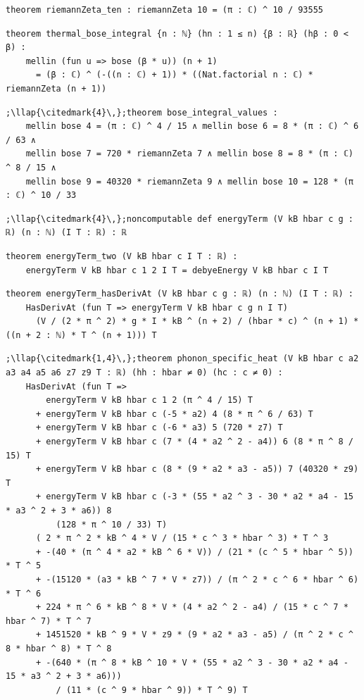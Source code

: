 \begin{lstlisting}[style=leancat]
theorem riemannZeta_ten : riemannZeta 10 = (π : ℂ) ^ 10 / 93555
\end{lstlisting}

\begin{lstlisting}[style=leancat]
theorem thermal_bose_integral {n : ℕ} (hn : 1 ≤ n) {β : ℝ} (hβ : 0 < β) :
    mellin (fun u => bose (β * u)) (n + 1)
      = (β : ℂ) ^ (-((n : ℂ) + 1)) * ((Nat.factorial n : ℂ) * riemannZeta (n + 1))
\end{lstlisting}

\begin{lstlisting}[style=leancat]
;\llap{\citedmark{4}\,};theorem bose_integral_values :
    mellin bose 4 = (π : ℂ) ^ 4 / 15 ∧ mellin bose 6 = 8 * (π : ℂ) ^ 6 / 63 ∧
    mellin bose 7 = 720 * riemannZeta 7 ∧ mellin bose 8 = 8 * (π : ℂ) ^ 8 / 15 ∧
    mellin bose 9 = 40320 * riemannZeta 9 ∧ mellin bose 10 = 128 * (π : ℂ) ^ 10 / 33
\end{lstlisting}

\begin{lstlisting}[style=leancat]
;\llap{\citedmark{4}\,};noncomputable def energyTerm (V kB hbar c g : ℝ) (n : ℕ) (I T : ℝ) : ℝ
\end{lstlisting}

\begin{lstlisting}[style=leancat]
theorem energyTerm_two (V kB hbar c I T : ℝ) :
    energyTerm V kB hbar c 1 2 I T = debyeEnergy V kB hbar c I T
\end{lstlisting}

\begin{lstlisting}[style=leancat]
theorem energyTerm_hasDerivAt (V kB hbar c g : ℝ) (n : ℕ) (I T : ℝ) :
    HasDerivAt (fun T => energyTerm V kB hbar c g n I T)
      (V / (2 * π ^ 2) * g * I * kB ^ (n + 2) / (hbar * c) ^ (n + 1) * ((n + 2 : ℕ) * T ^ (n + 1))) T
\end{lstlisting}

\begin{lstlisting}[style=leancat]
;\llap{\citedmark{1,4}\,};theorem phonon_specific_heat (V kB hbar c a2 a3 a4 a5 a6 z7 z9 T : ℝ) (hh : hbar ≠ 0) (hc : c ≠ 0) :
    HasDerivAt (fun T =>
        energyTerm V kB hbar c 1 2 (π ^ 4 / 15) T
      + energyTerm V kB hbar c (-5 * a2) 4 (8 * π ^ 6 / 63) T
      + energyTerm V kB hbar c (-6 * a3) 5 (720 * z7) T
      + energyTerm V kB hbar c (7 * (4 * a2 ^ 2 - a4)) 6 (8 * π ^ 8 / 15) T
      + energyTerm V kB hbar c (8 * (9 * a2 * a3 - a5)) 7 (40320 * z9) T
      + energyTerm V kB hbar c (-3 * (55 * a2 ^ 3 - 30 * a2 * a4 - 15 * a3 ^ 2 + 3 * a6)) 8
          (128 * π ^ 10 / 33) T)
      ( 2 * π ^ 2 * kB ^ 4 * V / (15 * c ^ 3 * hbar ^ 3) * T ^ 3
      + -(40 * (π ^ 4 * a2 * kB ^ 6 * V)) / (21 * (c ^ 5 * hbar ^ 5)) * T ^ 5
      + -(15120 * (a3 * kB ^ 7 * V * z7)) / (π ^ 2 * c ^ 6 * hbar ^ 6) * T ^ 6
      + 224 * π ^ 6 * kB ^ 8 * V * (4 * a2 ^ 2 - a4) / (15 * c ^ 7 * hbar ^ 7) * T ^ 7
      + 1451520 * kB ^ 9 * V * z9 * (9 * a2 * a3 - a5) / (π ^ 2 * c ^ 8 * hbar ^ 8) * T ^ 8
      + -(640 * (π ^ 8 * kB ^ 10 * V * (55 * a2 ^ 3 - 30 * a2 * a4 - 15 * a3 ^ 2 + 3 * a6)))
          / (11 * (c ^ 9 * hbar ^ 9)) * T ^ 9) T
\end{lstlisting}

